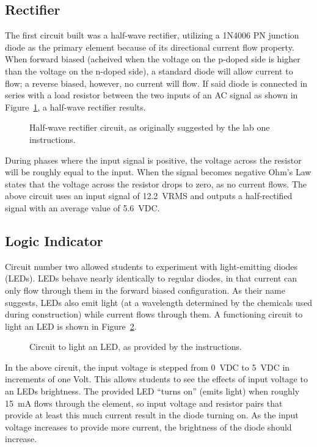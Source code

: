 \subsection{Rectifier}
The first circuit built was a half-wave rectifier, utilizing a 1N4006 PN
junction diode as the primary element because of its directional current flow
property.  When forward biased (acheived when the voltage on the p-doped side
is higher than the voltage on the n-doped side), a standard diode will allow
current to flow; a reverse biased, however, no current will flow.  If said
diode is connected in series with a load resistor between the two inputs of an
AC signal as shown in Figure~\ref{fig:schem1}, a half-wave rectifier results.
%
\begin{figure}[H]
	\centering
	
	\caption{Half-wave rectifier circuit, as originally suggested by the lab one instructions.}
	\label{fig:schem1}
\end{figure}
%
During phases where the input signal is positive, the voltage across the
resistor will be roughly equal to the input.  When the signal becomes negative
Ohm's Law states that the voltage across the resistor drops to zero, as no
current flows.  The above circuit uses an input signal of \SI{12.2}{\volt}RMS
and outputs a half-rectified signal with an average value of \SI{5.6}{\volt}DC.

\subsection{Logic Indicator}
Circuit number two allowed students to experiment with light-emitting diodes
(LEDs).  LEDs behave nearly identically to regular diodes, in that current can
only flow through them in the forward biased configuration.  As their name
suggests, LEDs also emit light (at a wavelength determined by the chemicals
used during construction) while current flows through them.  A functioning
circuit to light an LED is shown in Figure~\ref{fig:schem2}.
%
\begin{figure}[H]
	\centering
	
	\caption{Circuit to light an LED, as provided by the instructions.}
	\label{fig:schem2}
\end{figure}
%
In the above circuit, the input voltage is stepped from \SI{0}{\volt}DC to
\SI{5}{\volt}DC in increments of one Volt.  This allows students to see the
effects of input voltage to an LEDs brightness.  The provided LED ``turns on''
(emits light) when roughly \SI{15}{\milli\ampere} flows through the element, so
input voltage and resistor pairs that provide at least this much current result
in the diode turning on.  As the input voltage increases to provide more
current, the brightness of the diode should increase.


